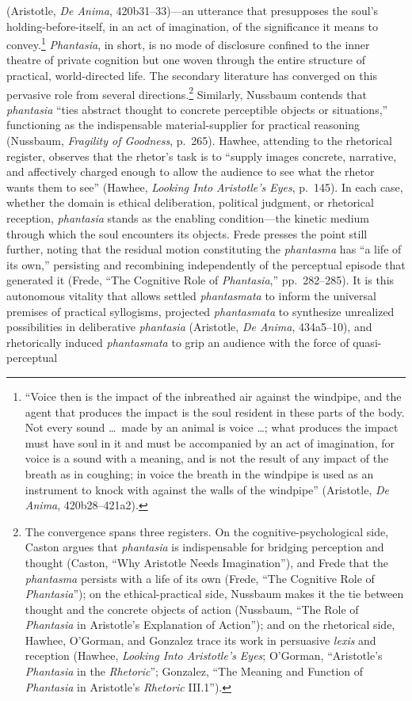 \documentclass{article}
\begin{document}
(Aristotle, \textit{De Anima}, 420b31--33)---an utterance that presupposes the soul's holding-before-itself, in an act of imagination, of the significance it means to convey.\footnote{``Voice then is the impact of the inbreathed air against the windpipe, and the agent that produces the impact is the soul resident in these parts of the body. Not every sound \ldots\ made by an animal is voice \ldots; what produces the impact must have soul in it and must be accompanied by an act of imagination, for voice is a sound with a meaning, and is not the result of any impact of the breath as in coughing; in voice the breath in the windpipe is used as an instrument to knock with against the walls of the windpipe'' (Aristotle, \textit{De Anima}, 420b28--421a2).} \textit{Phantasia}, in short, is no mode of disclosure confined to the inner theatre of private cognition but one woven through the entire structure of practical, world-directed life. The secondary literature has converged on this pervasive role from several directions.\footnote{The convergence spans three registers. On the cognitive-psychological side, Caston argues that \textit{phantasia} is indispensable for bridging perception and thought (Caston, ``Why Aristotle Needs Imagination''), and Frede that the \textit{phantasma} persists with a life of its own (Frede, ``The Cognitive Role of \textit{Phantasia}''); on the ethical-practical side, Nussbaum makes it the tie between thought and the concrete objects of action (Nussbaum, ``The Role of \textit{Phantasia} in Aristotle's Explanation of Action''); and on the rhetorical side, Hawhee, O'Gorman, and Gonzalez trace its work in persuasive \textit{lexis} and reception (Hawhee, \textit{Looking Into Aristotle's Eyes}; O'Gorman, ``Aristotle's \textit{Phantasia} in the \textit{Rhetoric}''; Gonzalez, ``The Meaning and Function of \textit{Phantasia} in Aristotle's \textit{Rhetoric} III.1'').} Similarly, Nussbaum contends that \textit{phantasia} ``ties abstract thought to concrete perceptible objects or situations,'' functioning as the indispensable material-supplier for practical reasoning (Nussbaum, \textit{Fragility of Goodness}, p.~265). Hawhee, attending to the rhetorical register, observes that the rhetor's task is to ``supply images concrete, narrative, and affectively charged enough to allow the audience to see what the rhetor wants them to see'' (Hawhee, \textit{Looking Into Aristotle's Eyes}, p.~145). In each case, whether the domain is ethical deliberation, political judgment, or rhetorical reception, \textit{phantasia} stands as the enabling condition---the kinetic medium through which the soul encounters its objects. Frede presses the point still further, noting that the residual motion constituting the \textit{phantasma} has ``a life of its own,'' persisting and recombining independently of the perceptual episode that generated it (Frede, ``The Cognitive Role of \textit{Phantasia},'' pp.~282--285). It is this autonomous vitality that allows settled \textit{phantasmata} to inform the universal premises of practical syllogisms, projected \textit{phantasmata} to synthesize unrealized possibilities in deliberative \textit{phantasia} (Aristotle, \textit{De Anima}, 434a5--10), and rhetorically induced \textit{phantasmata} to grip an audience with the force of quasi-perceptual 
\end{document}
